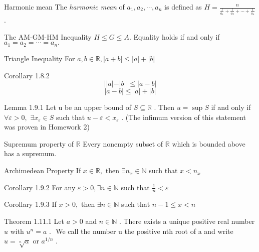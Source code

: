 \documentclass[10pt,landscape]{article}
\theoremstyle{definition}
\newcommand{\thistheoremname}{}
\newtheorem*{genericthm*}{\thistheoremname}
\newenvironment{namedthm*}[1]
{\renewcommand{\thistheoremname}{#1}\begin{genericthm*}}
{\end{genericthm*}}
\begin{document}
\begin{multicols}{3}
	\begin{namedthm*}{Harmonic mean}
		The \textit{harmonic mean} of \(a_{1},a_{2},\cdots,a_{n}\) is defined as \(H=\frac{n}{\frac{1}{a_1} + \frac{1}{a_2} + \cdots + \frac{1}{a_n}}\).
	\end{namedthm*}


	\begin{namedthm*}{The AM-GM-HM Inequality}
		\(H \leq G \leq A .\)
		Equality holds if and only if \(a_{1}=a_{2}=\cdots=a_{n} .\)
	\end{namedthm*}


	\begin{namedthm*}{Triangle Inequality}
		For \(a, b \in \mathbb{R},|a+b| \leq|a|+|b|\)
	\end{namedthm*}

	\begin{namedthm*}{Corollary 1.8.2}
		$$| | a|-| b| | \leq|a-b|$$
		$$|a-b| \leq|a|+|b|$$
	\end{namedthm*}



	\begin{namedthm*}{Lemma 1.9.1}
		Let u be an upper bound of \(S \subseteq \mathbb{R}\) . Then \(u=\sup S\) if and only if \(\forall \varepsilon>0,\)
		\(\exists x_{\varepsilon} \in S\) such that \(u-\varepsilon<x_{\varepsilon}\) . (The infimum version of this statement was proven in Homework 2)
	\end{namedthm*}

	\begin{namedthm*}{Supremum property of \(\mathbb{R}\)}
		Every nonempty subset of \(\mathbb{R}\) which is bounded above has a supremum.
	\end{namedthm*}

	\begin{namedthm*}{Archimedean Property}
		If \(x \in \mathbb{R},\) then \(\exists n_{x} \in \mathbb{N}\) such that \(x<n_{x}\)
	\end{namedthm*}

	\begin{namedthm*}{Corollary 1.9.2}
		For any \(\varepsilon>0, \exists n \in \mathbb{N}\) such that
		$
			\frac{1}{n}<\varepsilon
		$
	\end{namedthm*}

	\begin{namedthm*}{Corollary 1.9.3}
		If \(x>0,\) then \(\exists n \in \mathbb{N}\) such that
		$
			n-1 \leq x<n
		$
	\end{namedthm*}
	\begin{namedthm*}{Theorem 1.11.1}
		Let \(a>0\) and \(n \in \mathbb{N}\) . There exists a unique positive real number \(u\) with
		$
			u^{n}=a \text { . }
		$
		We call the number u the positive nth root of a and write \(u=\sqrt[n]{a}\) or \(a^{1 / n}\) .
	\end{namedthm*}


\end{multicols}
\end{document}
